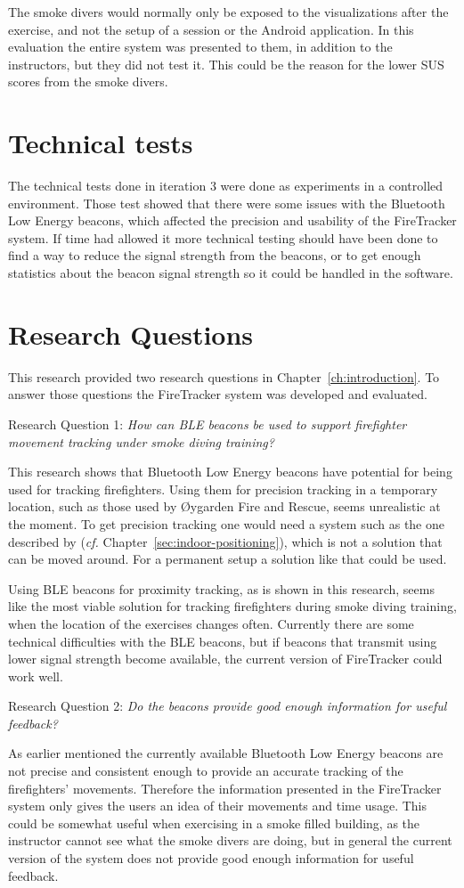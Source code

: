 \documentclass[../Main/thesis.tex]{subfiles}
\begin{document}
The smoke divers would normally only be exposed to the visualizations after the exercise, and not the setup of a session or the Android application.
In this evaluation the entire system was presented to them, in addition to the instructors, but they did not test it.
This could be the reason for the lower SUS scores from the smoke divers.

\section{Technical tests}
The technical tests done in iteration 3 were done as experiments in a controlled environment.
Those test showed that there were some issues with the Bluetooth Low Energy beacons, which affected the precision and usability of the FireTracker system.
If time had allowed it more technical testing should have been done to find a way to reduce the signal strength from the beacons, or to get enough statistics about the beacon signal strength so it could be handled in the software.

\section{Research Questions}
This research provided two research questions in Chapter~\ref{ch:introduction}.
To answer those questions the FireTracker system was developed and evaluated.

Research Question 1: \textit{How can BLE beacons be used to support firefighter movement tracking under smoke diving training?}

This research shows that Bluetooth Low Energy beacons have potential for being used for tracking firefighters.
Using them for precision tracking in a temporary location, such as those used by Øygarden Fire and Rescue, seems unrealistic at the moment.
To get precision tracking one would need a system such as the one described by \citet{Takahashi2016} (\textit{cf.} Chapter~\ref{sec:indoor-positioning}), which is not a solution that can be moved around.
For a permanent setup a solution like that could be used.

Using BLE beacons for proximity tracking, as is shown in this research, seems like the most viable solution for tracking firefighters during smoke diving training, when the location of the exercises changes often.
Currently there are some technical difficulties with the BLE beacons, but if beacons that transmit using lower signal strength become available, the current version of FireTracker could work well.

Research Question 2: \textit{Do the beacons provide good enough information for useful feedback?}

As earlier mentioned the currently available Bluetooth Low Energy beacons are not precise and consistent enough to provide an accurate tracking of the firefighters' movements.
Therefore the information presented in the FireTracker system only gives the users an idea of their movements and time usage.
This could be somewhat useful when exercising in a smoke filled building, as the instructor cannot see what the smoke divers are doing, but in general the current version of the system does not provide good enough information for useful feedback.
\end{document}
